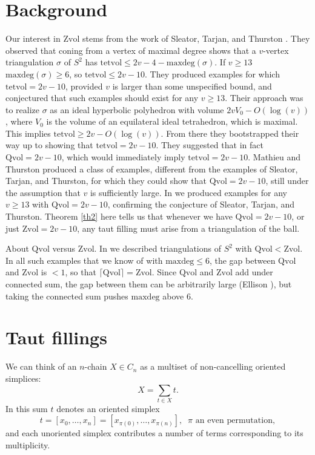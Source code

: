 \documentclass[12pt]{article}
\newcommand{\kw}{\mathrm}
\newcommand{\maxdeg}{\kw{maxdeg}}
\newcommand{\Zvol}{\kw{Zvol}}
\newcommand{\Qvol}{\kw{Qvol}}
\newcommand{\tetvol}{\kw{tetvol}}
\begin{document}
\section{Background}

Our interest in $\Zvol$ stems from the work
of Sleator, Tarjan, and Thurston
\cite{stt:jams}.
They observed that coning from a vertex of maximal degree
shows that a $v$-vertex
triangulation $\sigma$
of $S^2$ has $\tetvol \leq 2v-4-\maxdeg(\sigma)$.
If $v\geq13$ $\maxdeg(\sigma) \geq 6$, so $\tetvol \leq 2v-10$.
They
produced examples for which $\tetvol = 2v-10$, provided
$v$ is larger than some unspecified bound,
and conjectured that such examples should exist for any $v \geq 13$.
Their approach was to 
realize $\sigma$ as an ideal hyperbolic polyhedron
with volume $2v V_0-O(\log(v))$,
where $V_0$ is the volume of an
equilateral ideal tetrahedron,
which is maximal.
This implies $\tetvol \geq 2v-O(\log(v))$.
From there they bootstrapped their way up to showing
that $\tetvol=2v-10$.
They suggested
\cite[p. 697]{stt:jams}
that in fact $\Qvol= 2v-10$,
which would immediately imply $\tetvol=2v-10$.
Mathieu and Thurston \cite{mt}
produced a class of examples,
different from the examples of Sleator, Tarjan, and Thurston,
for which they could show that $\Qvol = 2v-10$,
still under the assumption that $v$
is sufficiently large.
In \cite{dew:filling} we produced examples for any $v \geq 13$ with
$\Qvol=2v-10$, confirming the conjecture of Sleator, Tarjan, and Thurston.
Theorem \ref{th2} here
tells us that whenever we have $\Qvol=2v-10$,
or just $\Zvol=2v-10$, any taut filling
must arise from a triangulation of the ball.

About $\Qvol$ versus $\Zvol$.
In \cite{dew:filling}
we described triangulations of $S^2$ with $\Qvol < \Zvol$.
In all such examples that we know of
with $\maxdeg \leq 6$, the gap between $\Qvol$ and $\Zvol$ is $<1$,
so that
$\lceil \Qvol \rceil = \Zvol$.
Since $\Qvol$ and $\Zvol$
add under connected sum,
the gap between them can be arbitrarily
large
(Ellison \cite{ellison:gap}),
but taking the connected sum pushes $\maxdeg$ above $6$.



\section{Taut fillings}

We can think of an $n$-chain $X \in C_n$ as a multiset of
non-cancelling oriented simplices:
\[
X = \sum_{t \in X} t
.
\]
In this sum $t$ denotes an oriented simplex
\[
t=[x_0,\ldots,x_n]
= [x_{\pi(0)},\ldots,x_{\pi(n)}]
,\;\;\mbox{$\pi$ an even permutation}
,
\]
and each unoriented simplex contributes a number of terms corresponding
to its multiplicity.
\end{document}
